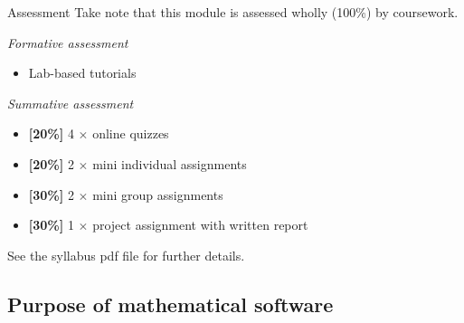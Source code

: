 \documentclass[,aspectratio=169]{beamer}
\providecommand{\tightlist}{%
  \setlength{\itemsep}{0pt}\setlength{\parskip}{0pt}}
\begin{document}
\begin{frame}{Assessment}
\protect\hypertarget{assessment}{}
Take note that this module is assessed wholly (100\%) by coursework.

\vspace{1em}

\emph{Formative assessment}

\begin{itemize}
\tightlist
\item
  Lab-based tutorials
\end{itemize}

\emph{Summative assessment}

\begin{itemize}
\tightlist
\item
  \textbf{{[}20\%{]}} 4 \(\times\) online quizzes
\item
  \textbf{{[}20\%{]}} 2 \(\times\) mini individual assignments
\item
  \textbf{{[}30\%{]}} 2 \(\times\) mini group assignments
\item
  \textbf{{[}30\%{]}} 1 \(\times\) project assignment with written
  report
\end{itemize}

\vspace{1em}

\textcolor{solidpink}{See the syllabus pdf file for further details.}
\end{frame}

\hypertarget{purpose-of-mathematical-software}{%
\subsection{Purpose of mathematical
software}\label{purpose-of-mathematical-software}}
\end{document}

